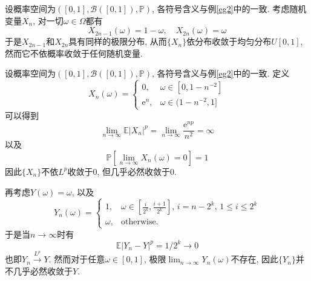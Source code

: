 \documentclass[cn, 12pt, math=mtpro2, bibstyle=apa, blue, twocol]{elegantbook}
\newcommand{\E}{\mathbb{E}}
\newcommand{\PP}{\mathbb{P}}
\newcommand{\limn}{\lim_{n\to\infty}}
\begin{document}
\begin{example}
设概率空间为$([0,1],\mathscr{B}([0,1]),\PP)$, 各符号含义与例\ref{eg2}中的一致. 考虑随机变量$X_n$, 对一切$\omega\in\Omega$都有
$$X_{2n-1}(\omega)=1-\omega,\quad X_{2n}(\omega)=\omega$$
于是$X_{2n-1}$和$X_{2n}$具有同样的极限分布, 从而$\{X_n\}$依分布收敛于均匀分布$U[0,1]$, 然而它不依概率收敛于任何随机变量.
\end{example}

\begin{example}
设概率空间为$([0,1],\mathscr{B}([0,1]),\PP)$, 各符号含义与例\ref{eg2}中的一致. 定义
$$X_n(\omega)=\begin{cases}
                0, & \omega\in[0,1-n^{-2}] \\
                \text{e}^n, & \omega\in(1-n^{-2},1]
              \end{cases}$$
可以得到
$$\limn\E|X_n|^p=\limn\frac{\text{e}^{np}}{n^2}=\infty$$
以及
$$\PP\left[\limn X_n(\omega)=0\right]=1$$
因此$\{X_n\}$不依$L^p$收敛于0, 但几乎必然收敛于0.

再考虑$Y(\omega)=\omega$, 以及
$$Y_n(\omega)=\begin{cases}
                1, & \omega\in \displaystyle\left[\frac{i}{2^k},\frac{i+1}{2^k}\right],\,i=n-2^k,\,1\leq i\leq 2^k\\
                \omega, & \mbox{otherwise}.
              \end{cases}$$
于是当$n\to\infty$时有
$$\E|Y_n-Y|^p=1/2^k\to0$$
也即$Y_n\xrightarrow{L^p}Y$. 然而对于任意$\omega\in[0,1]$, 极限$\displaystyle\limn Y_n(\omega)$不存在, 因此$\{Y_n\}$并不几乎必然收敛于$Y$.
\end{example}
\end{document}
